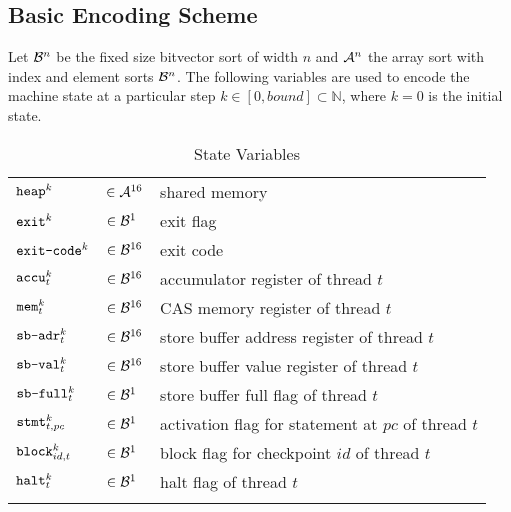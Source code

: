 
\subsection{Basic Encoding Scheme}

Let $\BVSORT[n]$ be the fixed size bitvector sort of width $n$ and $\ASORT[n]$ the array sort with index and element sorts $\BVSORT[n]$.
The following variables are used to encode the machine state at a particular step $k \in [0, bound] \subset \mathbb{N}$, where $k = 0$ is the initial state.

\setlength{\tabulinesep}{3pt}
\begin{longtabu}{llX}
  \firsthline
  $\HEAP^k$ & $\in \ASORT$ & shared memory \\
  $\EXIT^k$ & $\in \BVSORT[1]$ & exit flag \\
  $\EXITCODE^k$ & $\in \BVSORT$ & exit code \\
  \hline
  $\ACCU^k_t$ & $\in \BVSORT$ & accumulator register of thread $t$ \\
  $\MEM^k_t$ & $\in \BVSORT$ & CAS memory register of thread $t$ \\
  $\SBADR^k_t$ & $\in \BVSORT$ & store buffer address register of thread $t$ \\
  $\SBVAL^k_t$ & $\in \BVSORT$ & store buffer value register of thread $t$ \\
  $\SBFULL^k_t$ & $\in \BVSORT[1]$ & store buffer full flag of thread $t$ \\
  $\STMT^k_{t, pc}$ & $\in \BVSORT[1]$ & activation flag for statement at $pc$ of thread $t$ \\
  $\BLOCK^k_{id, t}$ & $\in \BVSORT[1]$ & block flag for checkpoint $id$ of thread $t$ \\
  $\HALT^k_t$ & $\in \BVSORT[1]$ & halt flag of thread $t$ \\
  \lasthline
  \caption{State Variables}
  \label{tbl:states}
\end{longtabu}

\newcommand{\READ}{\texttt{read}}
\newcommand{\WRITE}{\texttt{write}}

